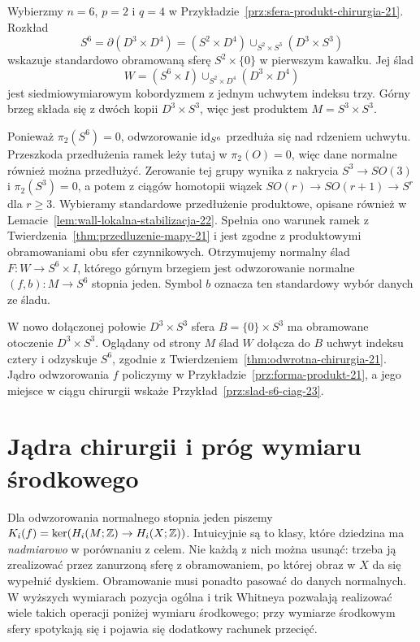 \begin{przyklad}
\label{prz:slad-s6-produkt-21}
Wybierzmy $n=6$, $p=2$ i $q=4$ w
Przykładzie~\ref{prz:sfera-produkt-chirurgia-21}.
Rozkład
\[
 S^6=\partial(D^3\times D^4)
 =(S^2\times D^4)\cup_{S^2\times S^3}
   (D^3\times S^3)
\]
wskazuje standardowo obramowaną sferę
$S^2\times\{0\}$ w pierwszym kawałku.
Jej ślad
\[
 W=(S^6\times I)\cup_{S^2\times D^4}
   (D^3\times D^4)
\]
jest siedmiowymiarowym kobordyzmem z jednym
uchwytem indeksu trzy. Górny brzeg składa się
z dwóch kopii $D^3\times S^3$, więc jest
produktem $M=S^3\times S^3$.

Ponieważ $\pi_2(S^6)=0$, odwzorowanie
$\mathrm{id}_{S^6}$ przedłuża się nad rdzeniem
uchwytu. Przeszkoda przedłużenia ramek leży tutaj w $\pi_2(O)=0$,
więc dane normalne również można przedłużyć.
Zerowanie tej grupy wynika z nakrycia $S^3\to SO(3)$
i $\pi_2(S^3)=0$, a potem z ciągów homotopii wiązek
$SO(r)\to SO(r+1)\to S^r$ dla $r\geq3$.
Wybieramy standardowe przedłużenie produktowe,
opisane również w Lemacie~\ref{lem:wall-lokalna-stabilizacja-22}.
Spełnia ono warunek ramek z
Twierdzenia~\ref{thm:przedluzenie-mapy-21}
i jest zgodne z produktowymi obramowaniami
obu sfer czynnikowych.
Otrzymujemy normalny ślad $F:W\to S^6\times I$,
którego górnym brzegiem jest odwzorowanie normalne
$(f,b):M\to S^6$ stopnia jeden. Symbol $b$
oznacza ten standardowy wybór danych ze śladu.

W nowo dołączonej połowie $D^3\times S^3$
sfera $B=\{0\}\times S^3$ ma obramowane
otoczenie $D^3\times S^3$. Oglądany od strony
$M$ ślad $W$ dołącza do $B$ uchwyt indeksu
cztery i odzyskuje $S^6$, zgodnie z
Twierdzeniem~\ref{thm:odwrotna-chirurgia-21}.
Jądro odwzorowania $f$ policzymy w
Przykładzie~\ref{prz:forma-produkt-21}, a jego
miejsce w ciągu chirurgii wskaże
Przykład~\ref{prz:slad-s6-ciag-23}.
\end{przyklad}

\section{Jądra chirurgii i próg wymiaru środkowego}
\label{sec:jadra-chirurgii-21}

Dla odwzorowania normalnego stopnia jeden
piszemy $K_i(f)=\ker(H_i(M;\mathbb{Z})\to H_i(X;\mathbb{Z}))$.
Intuicyjnie są to klasy, które dziedzina ma
\emph{nadmiarowo} w porównaniu z celem.
Nie każdą z nich można usunąć: trzeba ją
zrealizować przez zanurzoną sferę z obramowaniem,
po której obraz w $X$ da się wypełnić dyskiem.
Obramowanie musi ponadto pasować do danych
normalnych. W wyższych wymiarach pozycja ogólna
i trik Whitneya pozwalają realizować wiele
takich operacji poniżej wymiaru środkowego;
przy wymiarze środkowym sfery spotykają się
i pojawia się dodatkowy rachunek przecięć.

